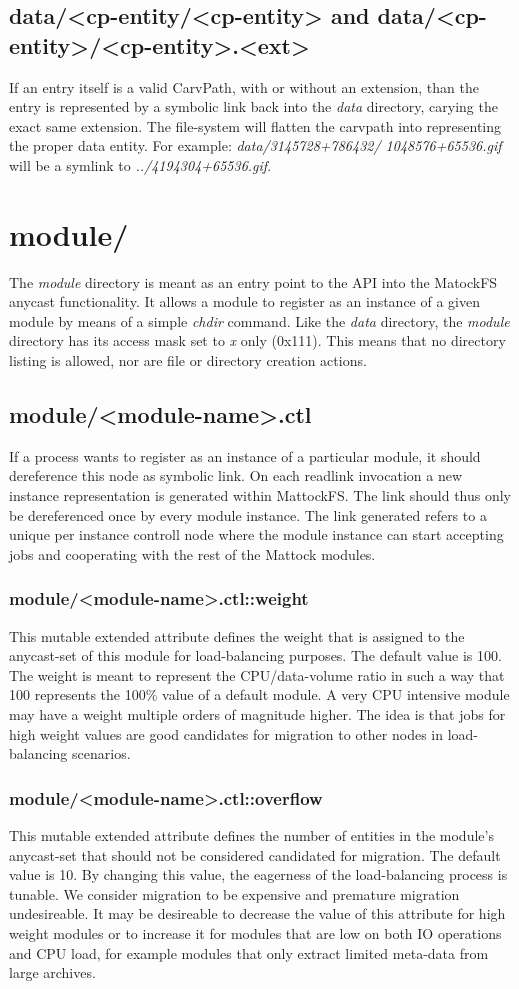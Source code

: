 \subsection{data/<cp-entity/<cp-entity> and data/<cp-entity>/<cp-entity>.<ext>}
If an entry itself is a valid CarvPath, with or without an extension, than the entry is represented by a symbolic link back into the \emph{data} directory, carying the exact same extension. The file-system will flatten the carvpath into representing the proper data entity. For example: \emph{data/3145728+786432/ 1048576+65536.gif} will be a symlink to \emph{../4194304+65536.gif}.
\section{module/}
The \emph{module} directory is meant as an entry point to the API into the MatockFS anycast functionality. It allows a module to register as an instance of a given module by means of a simple \emph{chdir} command. Like the \emph{data} directory, the \emph{module} directory has its access mask set to \emph{x} only (0x111). This means that no directory listing is allowed, nor are file or directory creation actions.
\subsection{module/<module-name>.ctl}
If a process wants to register as an instance of a particular module, it should dereference this node as symbolic link. On each readlink invocation a new instance representation is generated within MattockFS. The link should thus only be dereferenced once by every module instance. The link generated refers to a unique per instance controll node where the module instance can start accepting jobs and cooperating with the rest of the Mattock modules.
\subsubsection{module/<module-name>.ctl::weight}
This mutable extended attribute defines the weight that is assigned to the anycast-set of this module for load-balancing purposes. The default value is 100. The weight is meant to represent the CPU/data-volume ratio in such a way that 100 represents the 100\% value of a default module. A very CPU intensive module may have a weight multiple orders of magnitude higher. The idea is that jobs for high weight values are good candidates for migration to other nodes in load-balancing scenarios.
\subsubsection{module/<module-name>.ctl::overflow}
This mutable extended attribute defines the number of entities in the module's anycast-set that should not be considered candidated for migration. The default value is 10. By changing this value, the eagerness of the load-balancing process is tunable. We consider migration to be expensive and premature migration undesireable. It may be desireable to decrease the value of this attribute for high weight modules or to increase it for modules that are low on both IO operations and CPU load, for example modules that only extract limited meta-data from large archives.

